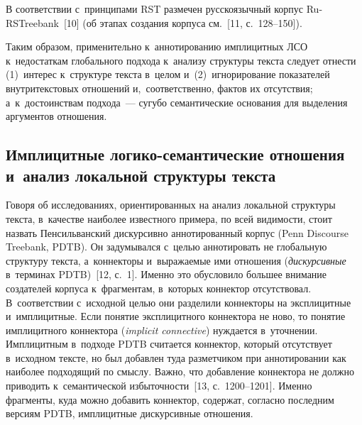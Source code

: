 \begin{multicols}{2}
В соответствии с~принципами RST размечен русскоязычный корпус 
 Ru-RSTreebank~[10] (об этапах создания корпуса см.~[11, с.~128--150]).

Таким образом, применительно к~аннотированию имплицитных ЛСО 
к~недостаткам глобального подхода к~анализу структуры текста следует 
от\-нес\-ти (1)~интерес к~структуре текста в~целом и~(2)~игнорирование 
показателей внутритекстовых отношений и,~соответственно, фактов их 
отсутствия; а~к~достоинствам подхода~--- сугубо семантические основания 
для выделения аргументов отношения.


\vspace*{-6pt}

\subsection{Имплицитные логико-семантические отношения и~анализ локальной структуры текста} 

\vspace*{-2pt}

Говоря об исследованиях, ориентированных на анализ локальной структуры 
текста, в~качестве наиболее известного примера, по всей ви\-ди\-мости, стоит 
назвать Пенсильванский дискурсивно аннотированный корпус (Penn 
Discourse Treebank, PDTB). Он задумывался с~целью аннотировать не 
глобальную структуру текста, а~коннекторы и~выражаемые ими отношения 
(\textit{дискурсивные} в~терминах PDTB)~[12, с.~1]. Именно это обусловило 
большее внимание создателей корпуса к~фрагментам, в~которых коннектор 
отсутствовал. В~соответствии с~исходной целью они разделили коннекторы 
на эксплицитные и~имплицитные. Если понятие эксплицитного коннектора 
не ново, то понятие имплицитного коннектора (\textit{implicit connective}) 
нуждается в~уточнении. Имплицитным в~подходе PDTB считается коннектор, 
который отсутствует в~исходном тексте, но был добавлен туда разметчиком 
при аннотировании как наиболее подходящий по смыс\-лу. Важно, что 
добавление коннектора не должно приводить к~семантической 
избыточности~[13, с.~1200--1201]. Именно фрагменты, куда можно добавить 
коннектор, содержат, согласно последним версиям PDTB, имплицитные 
дискурсивные отношения.


\end{multicols}
